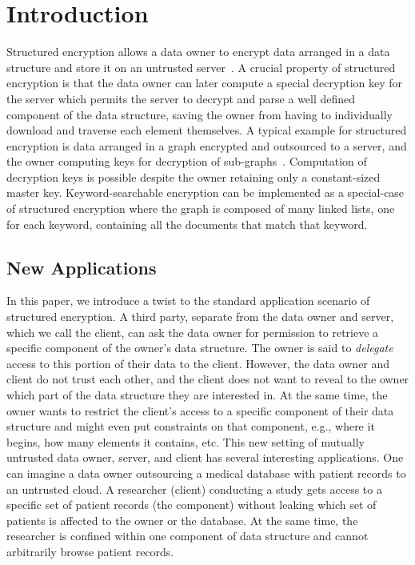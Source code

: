 \section{Introduction}
Structured encryption allows a data owner to encrypt data arranged in
a data structure and store it on an untrusted
server~\cite{chase2010structured}.  A crucial property of structured
encryption is that the data owner can later compute a special
decryption key for the server which permits the server to decrypt and
parse a well defined component of the data structure, saving the owner
from having to individually download and traverse each element
themselves.  A typical example for structured encryption is data
arranged in a graph encrypted and outsourced to a server, and the
owner computing keys for decryption of sub-graphs~\cite{sherman1}.
Computation of decryption keys is possible despite the owner retaining
only a constant-sized master key. Keyword-searchable encryption can be
implemented as a special-case of structured encryption where the graph
is composed of many linked lists, one for each keyword, containing all
the documents that match that keyword.

\subsection{New Applications} In this paper, we introduce a twist to
the standard application scenario of structured encryption.  A third
party, separate from the data owner and server, which we call the
client, can ask the data owner for permission to retrieve a specific
component of the owner's data structure.  The owner is said to
\emph{delegate} access to this portion of their data to the client.
However, the data owner and client do not trust each other, and the
client does not want to reveal to the owner which part of the data
structure they are interested in.  At the same time, the owner wants
to restrict the client's access to a specific component of their data
structure and might even put constraints on that component, e.g.,
where it begins, how many elements it contains, etc. This new setting
of mutually untrusted data owner, server, and client has several
interesting applications. One can imagine a data owner outsourcing a
medical database with patient records to an untrusted cloud. A
researcher (client) conducting a study gets access to a specific set
of patient records (the component) without leaking which set of
patients is affected to the owner or the database. At the same time,
the researcher is confined within one component of data structure and
cannot arbitrarily browse patient records.

